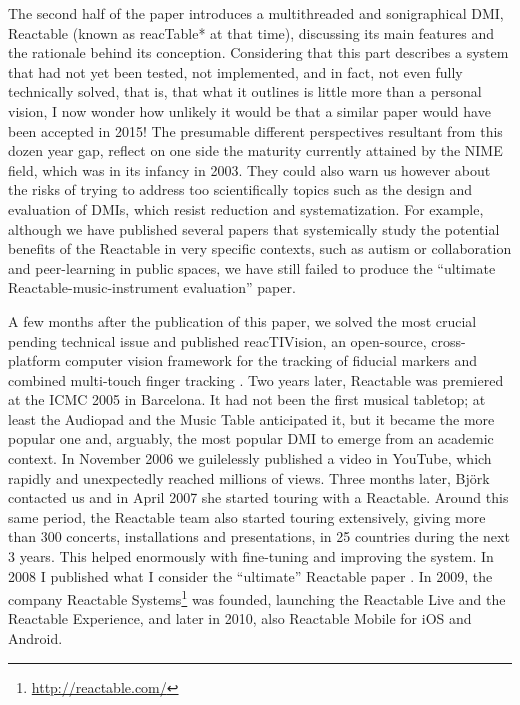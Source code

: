 The second half of the paper introduces a multithreaded and sonigraphical DMI, Reactable (known as reacTable* at that time), discussing its main features and the  rationale behind its conception. Considering that this part describes a system that had not yet been tested, not implemented, and in fact, not even fully technically solved, that is, that what it outlines is little more than a personal vision, I now wonder how unlikely it would be that a similar paper would have been accepted in 2015! The presumable different perspectives resultant from this dozen year gap, reflect on one side the maturity currently attained by the NIME field, which was in its infancy in 2003. They could also warn us however about the risks of trying to address too scientifically topics such as the design and evaluation of DMIs, which resist reduction and systematization. For example, although we have published several papers that systemically study the potential benefits of the Reactable in very specific contexts, such as autism \cite{Xambo:2013} or collaboration and peer-learning in public spaces, we have still failed to produce the ``ultimate Reactable-music-instrument evaluation'' paper.

A few months after the publication of this paper, we solved the most crucial pending technical issue and published reacTIVision, an open-source, cross-platform computer vision framework for the tracking of fiducial markers and combined multi-touch finger tracking \cite{Bencina:2005}. Two years later, Reactable was premiered at the ICMC 2005 in Barcelona. It had not been the first musical tabletop; at least the Audiopad \cite{Patten:2002} and the Music Table anticipated it, but it became the more popular one and, arguably,  the most popular DMI to emerge from an academic context. In November 2006 we guilelessly published a video in YouTube, which rapidly and unexpectedly reached millions of views. Three months later, Bj\"{o}rk contacted us and in April 2007 she started touring with a Reactable. Around this same period, the Reactable team also started touring extensively, giving more than 300 concerts, installations and presentations, in 25 countries during the next 3 years. This helped enormously with fine-tuning and improving the system. In 2008 I published what I consider the ``ultimate'' Reactable paper \cite{Jorda:2008}. In 2009, the company Reactable Systems\footnote{\url{http://reactable.com/}} was founded, launching the Reactable Live and the Reactable Experience, and later in 2010, also Reactable Mobile for iOS and Android. 


